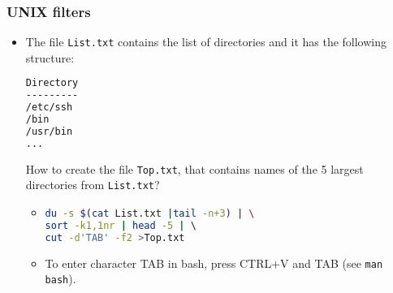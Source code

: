 \begin{frame}[fragile]
\frametitle{UNIX filters}
	\begin{itemize}
	
		\item The file \texttt{List.txt} contains the list of directories and it has the following structure:
		
		\begin{footnotesize}
\begin{lstlisting}[language=bash]		
Directory
---------
/etc/ssh
/bin
/usr/bin
...
\end{lstlisting}		
		\end{footnotesize}
		
		How to create the file \texttt{Top.txt}, that contains names of the 5 largest directories from \texttt{List.txt}?
					
		\begin{itemize}
			\item
\begin{lstlisting}[language=bash]		
du -s $(cat List.txt |tail -n+3) | \
sort -k1,1nr | head -5 | \ 
cut -d'TAB' -f2 >Top.txt
\end{lstlisting}

			\item To enter character TAB in bash, press CTRL+V and TAB (see \texttt{man bash}).
		\end{itemize}
			
	\end{itemize}
\end{frame}

